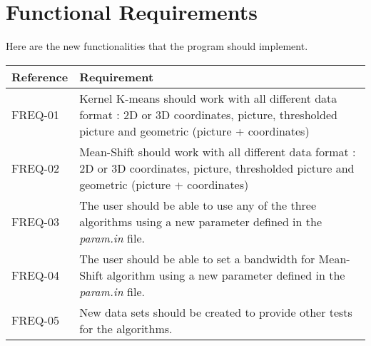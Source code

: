 \section{Functional Requirements}
Here are the new functionalities that the program should implement.
\begin{flushleft}
    \begin{tabular}{ | p{} |  p{} |}
    \hline
   	\textbf{Reference} & \textbf{Requirement}
    \\
    \hline
	FREQ-01 & Kernel K-means should work with all different data format : 2D or 3D coordinates, picture, thresholded picture and geometric (picture + coordinates)
    \\ 
    \hline
	FREQ-02 & Mean-Shift should work with all different data format : 2D or 3D coordinates, picture, thresholded picture and geometric (picture + coordinates)
    \\ 
    \hline
	FREQ-03 & The user should be able to use any of the three algorithms using a new parameter defined in the \textit{param.in} file.
    \\ 
    \hline
   	FREQ-04 & The user should be able to set a bandwidth for Mean-Shift algorithm using a new parameter defined in the \textit{param.in} file.
   	\\ 
    \hline
    FREQ-05 & New data sets should be created to provide other tests for the algorithms.
   	\\ 
    \hline
    \end{tabular}
\end{flushleft}
